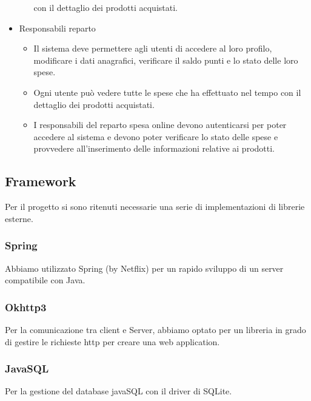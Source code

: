 \documentclass[12pt, a4paper]{report}
\begin{document}
\begin{itemize}
\begin{itemize}
        con il dettaglio dei prodotti acquistati.
    \end{itemize}
  \item Responsabili reparto
    \begin{itemize}
      \item Il sistema deve permettere agli utenti di accedere al
        loro profilo, modificare i dati anagrafici, verificare il saldo
        punti e lo stato delle loro spese.
      \item Ogni utente può vedere tutte le spese che ha effettuato nel tempo
        con il dettaglio dei prodotti acquistati.
      \item I responsabili del reparto spesa online devono autenticarsi per
        poter accedere al sistema e devono poter verificare lo stato delle
        spese e provvedere all’inserimento delle informazioni relative ai
        prodotti.
    \end{itemize}
\end{itemize}

\subsection{Framework}

Per il progetto si sono ritenuti necessarie una serie di implementazioni di
librerie esterne.

\subsubsection{Spring}

Abbiamo utilizzato Spring (by Netflix) per un rapido sviluppo di un server
compatibile con Java.

\subsubsection{Okhttp3}

Per la comunicazione tra client e Server, abbiamo optato per un libreria in 
grado di gestire le richieste http per creare una web application.

\subsubsection{JavaSQL}

Per la gestione del database javaSQL con il driver di SQLite.
\end{document}
